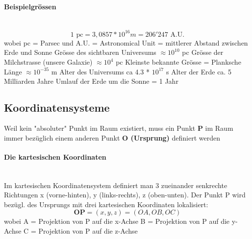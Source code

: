 \documentclass[7pt]{article}
\begin{document}
\begin{multicols}{3}
\paragraph{Beispielgr{\"o}ssen}
\mbox{}\\ 
\begin{equation}
	1  \text{ pc} = 3,0857*10^{16} m = 206'247 \text{ A.U.}
\end{equation} 
wobei pc = Parsec und A.U. = Astronomical Unit = mittlerer Abstand zwischen Erde und Sonne
\newline
\newline Gr{\"o}sse des sichtbaren Universums $\approx 10^{10}$ pc 	
\newline Gr{\"o}sse der Milchstrasse (unsere Galaxie) $\approx 10^4$ pc
\newline Kleinste bekannte Gr{\"o}sse = Planksche L{\"a}nge $\approx 10^{-35}$ m
\newline
\newline Alter des Universums ca 4.3 * $10^{17}$ s
\newline Alter der Erde ca. 5 Milliarden Jahre
\newline Umlauf der Erde um die Sonne = 1 Jahr



\subsection{Koordinatensysteme}

Weil kein "absoluter" Punkt im Raum existiert, muss ein Punkt \textbf{P} im Raum immer bezüglich einem anderen Punkt \textbf{O (Ursprung)} definiert werden


\paragraph{Die kartesischen Koordinaten}

\mbox{}\\ Im kartesischen Koordinatensystem definiert man 3 zueinander senkrechte Richtungen x (vorne-hinten), y (links-rechts), z (oben-unten). Der Punkt P wird bezügl. des Ursprungs mit drei kartesischen Koordinaten lokalisiert:
\begin{equation}
	\textbf{OP} = (x,y,z) = (OA, OB, OC)
\end{equation}
wobei A = Projektion von P auf die x-Achse
\newline B = Projektion von P auf die y-Achse
\newline C = Projektion von P auf die z-Achse



\end{multicols}
\end{document}
